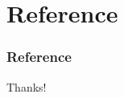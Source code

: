 \documentclass[8]{beamer}
\begin{document}

\section{Reference}

\begin{frame}[allowframebreaks]
    \frametitle{Reference}
    \tiny
    
    
\end{frame}

\begin{frame}
    \begin{center}
        {\Huge\calligra Thanks!}
    \end{center}
\end{frame}
\end{document}
